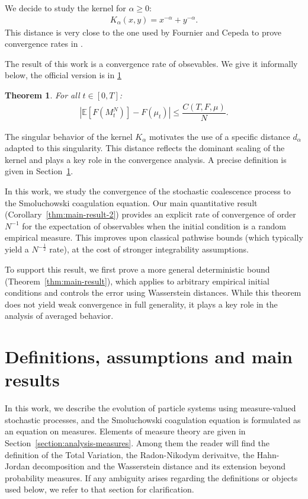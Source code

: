 \documentclass[11pt,a4paper]{article}
\newcommand{\E}[1]{\mathbb{E}\left[#1\right]}
\newtheorem{theorem}{Theorem}[section]
\begin{document}
We decide to study the kernel for $\alpha \geq 0$:
\begin{align*}
    K_\alpha(x,y) = x^{-\alpha} + y^{-\alpha}.
\end{align*}
This distance is very close to the one used by Fournier and Cepeda to prove convergence rates in \cite{fournier2015rate}.

The result of this work is a convergence rate of obsevables. We give it informally below, the official version is in \ref{section-main-results}
\begin{theorem}
    For all $t \in [0,T]$:
    \begin{align*}
    \left|\E{F\left(M^N_t\right)} - F(\mu_t) \right| \leq  \dfrac{C(T,F,\mu)}{N} .
    \end{align*}
\end{theorem}

The singular behavior of the kernel $K_\alpha$ motivates the use of a specific distance $d_\alpha$ adapted to this singularity. This distance reflects the dominant scaling of the kernel and plays a key role in the convergence analysis. A precise definition is given in Section~\ref{section-main-results}.

In this work, we study the convergence of the stochastic coalescence process to the Smoluchowski coagulation equation. Our main quantitative result (Corollary~\ref{thm:main-result-2}) provides an explicit rate of convergence of order $N^{-1}$ for the expectation of observables when the initial condition is a random empirical measure. This improves upon classical pathwise bounds (which typically yield a $N^{-\frac{1}{2}}$ rate), at the cost of stronger integrability assumptions.

To support this result, we first prove a more general deterministic bound (Theorem~\ref{thm:main-result}), which applies to arbitrary empirical initial conditions and controls the error using Wasserstein distances. While this theorem does not yield weak convergence in full generality, it plays a key role in the analysis of averaged behavior.


\section{Definitions, assumptions and main results}\label{section-main-results}
In this work, we describe the evolution of particle systems using measure-valued stochastic processes, and the Smoluchowski coagulation equation is formulated as an equation on measures. Elements of measure theory are given in Section~\ref{section:analysis-measures}. Among them the reader will find the definition of the Total Variation, the Radon-Nikodym derivaitve, the Hahn-Jordan decomposition and the Wasserstein distance and its extension beyond probability measures. If any ambiguity arises regarding the definitions or objects used below, we refer to that section for clarification.
\end{document}
